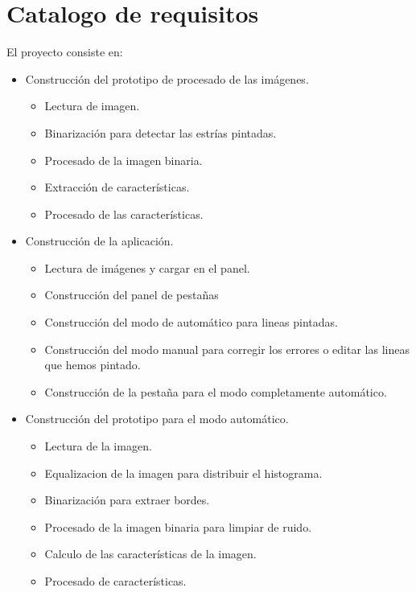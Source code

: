 \section{Catalogo de requisitos}
El proyecto consiste en:
\begin{itemize}
	\item Construcción del prototipo de procesado de las imágenes.
		\begin{itemize}
			\item Lectura de imagen.
			\item Binarización para detectar las estrías pintadas.
			\item Procesado de la imagen binaria.
			\item Extracción de características.
			\item Procesado de las características.
		\end{itemize}
	\item Construcción de la aplicación.
		\begin{itemize}
			\item Lectura de imágenes y cargar en el panel.
			\item Construcción del panel de pestañas
			\item Construcción del modo de automático para lineas pintadas.
			\item Construcción del modo manual para corregir los errores o editar las lineas que hemos pintado.
			\item Construcción de la pestaña para el modo completamente automático.			
		\end{itemize}
	\item Construcción del prototipo para el modo automático.
		\begin{itemize}
			\item Lectura de la imagen.
			\item Equalizacion de la imagen para distribuir el histograma.
			\item Binarización para extraer bordes.
			\item Procesado de la imagen binaria para limpiar de ruido.
			\item Calculo de las características de la imagen.
			\item Procesado de características.		
		\end{itemize}
\end{itemize}


